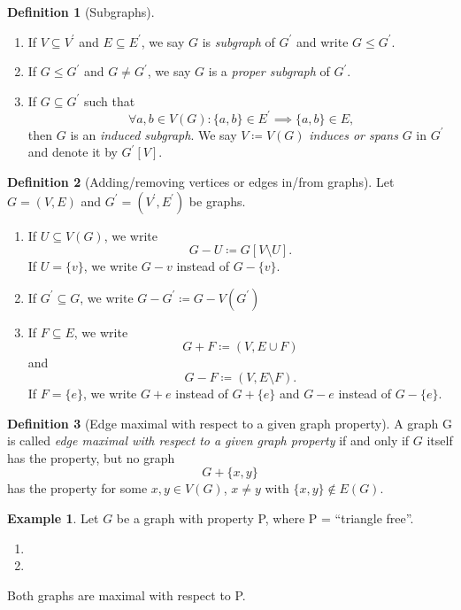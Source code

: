 \documentclass[a4paper]{article}
\theoremstyle{definition}\newtheorem*{defi*}{Definition}
\theoremstyle{remark}\newtheorem*{rem}{Remark}
\theoremstyle{plain}\newtheorem{lemma}[cnt]{Lemma}
\theoremstyle{definition}\newtheorem*{ex}{Example}
\theoremstyle{definition}\newtheorem*{exs}{Examples}
\theoremstyle{plain}\newtheorem{theorem}[cnt]{Theorem}
\theoremstyle{plain}\newtheorem{prop}[cnt]{Proposition}
\theoremstyle{plain}\newtheorem*{cor*}{Corollary}
\theoremstyle{definition}\newtheorem{nota}{Notation}
\theoremstyle{definition}\newtheorem*{nota*}{Notation}
\theoremstyle{plain}\newtheorem{conj}[cnt]{Conjecture}
\begin{document}
\begin{defi*}[Subgraphs]
  \begin{enumerate}
    \item If $V \subseteq V^\prime$ and $E \subseteq E^\prime$, we say $G$ is \emph{subgraph} of $G^\prime$ and write $G \leq G^\prime$.
    \item If $G \leq G^\prime$ and $G \neq G^\prime$, we say $G$ is a \emph{proper subgraph} of $G^\prime$.
    \item If $G \subseteq G^\prime$ such that 
    \[ \forall a,b \in V(G) : \{a,b\} \in E^\prime \implies \{a,b\} \in E \text{,} \]
    then $G$ is an \emph{induced subgraph}.
    We say $V \coloneqq V(G)$ \emph{induces or spans} $G$ in $G^\prime$ and denote it by $G^\prime[V]$.
  \end{enumerate}
\end{defi*}

\begin{defi*}[Adding/removing vertices or edges in/from graphs]
  Let $G = (V,E)$ and $G^\prime = (V^\prime,E^\prime)$ be graphs.
  \begin{enumerate}[label=(\alph*)]
    \item If $U \subseteq V(G)$, we write 
    \[G - U \coloneqq G[V\setminus U] \text{.} \]
    If $U = \{v\}$, we write $G - v$ instead of $G - \{v\}$.
    \item If $G^\prime \subseteq G$, we write $G - G^\prime \coloneqq G - V(G^\prime)$
    \item If $F \subseteq E$, we write 
    \[ G + F \coloneqq (V, E \cup F) \]
    and
    \[ G - F \coloneqq (V, E \setminus F) \text{.} \]
    If $F = \{e\}$, we write $G + e$ instead of $G + \{e\}$ and $G - e$ instead of $G - \{e\}$.
  \end{enumerate}
\end{defi*}

\begin{defi*}[Edge maximal with respect to a given graph property]
A graph G is called \emph{edge maximal with respect to a given graph property} if and only if $G$ itself has the property, but no graph 
\[ G + \{x,y\} \]
has the property for some $x,y \in V(G)$, $x \neq y$ with $\{x,y\} \notin E(G)$.
\end{defi*}

\begin{ex}
  Let $G$ be a graph with property P, where P = \enquote{triangle free}.
  \begin{enumerate}[label=(\alph*)]
    \item {}
    \item {}
  \end{enumerate}
  Both graphs are maximal with respect to P.
\end{ex}
\end{document}
